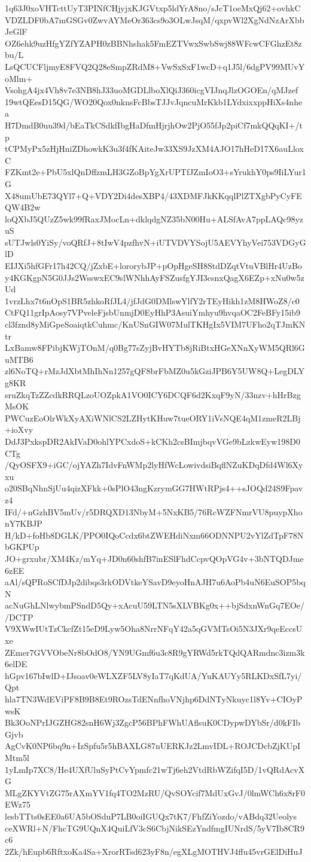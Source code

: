 1q63J0xoVHTcttUyT3PINfCHjyjxKJGVtxp5ldYrA8no/sJcT1oeMxQj62+ovhkC
VDZLDF0bA7mGSGv0ZwvAYMeOr363cs9o3OLwJsqM/qxpvWl2XgNdNzArXbbJeGlF
OZ6ehk9uzHfgYZfYZAPH0zBBNhshak5FmEZTVwxSwbSwj88WFcwCFGhzEt8zbu/L
LsQCUCFljmyE8FVQ2Q28eSmpZRdM8+VwSxSxF1wcD+q1J5l/6dgPV99MUvYoMlm+
VsohgA4jx4Vh8v7e3NB8hJ33uoMGDLlboXlQiJ360icgVIJnqJlzOGOEn/qMJzef
19wtQEesD15QG/WO20Qox0nknsFcBbsTJJvJqncuMrKkb1LYdxixxppHiXs4nhea
H7DmdB0uu39d/bEaTkCSdkfIbgHaDfmHjrjhOw2PjO55fJp2piCf7mkQQqKI+/tp
tCPMyPx5zHjHniZDhowkK3u3f4fKAiteJw33XS9JzXM4AJO17hHeD17X6auLloxC
FZKmt2e+PbU5xlQnDffzmLH3GZoBpYgXrUPTfJZmIoO3+sYrukhY0ps9IiLYur1G
X48umUbE73QYl7+Q+VDY2Di4desXBP4/43XDMFJkKKqqlPlZTXgbPyCyFEQW4B2w
loQXbJ5QUzZ5wk99fRaxJMocLn+dklqdgNZ35bN00Hu+ALSfAvA7ppLAQc98yzuS
sUTJwls0YiSy/voQRfJ+8tIwV4pzfhvN+iUTVDVYSojU5AEVYhyVei753VDGyGlD
EIJXi5hfGFr17h42CQ/jZxbE+lororybJP+pOpHgeSH8StdDZqtVtuVBlHr4UzBo
y4KGKgpN5G0JJs2WsswxEC9slWNhhAyFSZusfgYJI3csnxQagX6EZp+xNu0w5zUd
1vrzLhx7t6nOpS1BR5zhkoRfJL4/jfJdG0DMlswYlfY2rTEyHikh1zM8HWoZ8/c0
CtFQ11grIpAosy7VPveleFjsbUnmjD0EyHhP3AsuiYmhyu9hvqaOC2FeBFy15ib9
cl3fznd8yMiGpeSoaiqtkCuhmc/KnUSnGIW07MulTKHgIx5VIM7UFho2qTJmKNtr
LxBamw8FPibjKWjTOnM/q0Bg77sZyjBvHYTb8jRiBtxHGeXNnXyWM5QRl6GuMTB6
zl6NoTQ+rMzJdXbtMhIhNn1257gQF8brFbMZ0u5kGziJPB6Y5UW8Q+LegDLYg8KR
sruZkqTzZZcdkRRQLzoUOZpkA1VO0ICY6DCQF6d2KxqF9yN/33nzv+hHrBzgMsOK
PWCuzEoOlrWkXyAXiWNlCS2LZHytKHuw7tueORY1iVsNQE4qM1zmeR2LBj+ioXvy
DdJ3PxkspDR2AkIVaD0ohlYPCxdoS+kCKh2csBImjbqvVGe9bLzkwEyw198D0CTg
/QyOSFX9+iGC/ojYAZh7IdvFnWMp2lyHfWcLowivdsiBqflNZuKDqDfd4Wl6Xyxu
o20SBqNhnSjUu4qizXFkk+0sPlO43ngKzrymGG7HWtRPjs4++sJOQd24S9Fpavz4
IFd/+nGzhBV5mUv/r5DRQXD13NbyM+5NxKB5/76RcWZFNmrVU8puypXhonY7KBJP
H/kD+foHb8DGLK/PPO0IQoCcdx6btZWEHdiNxm66ODNNPU2vYlZdTpF78NbGKPUp
JO+grxubr/XM4Kz/mYq+JD0n60shfB7inESlFhdCcpvQOpVG4v+3bNTQDJme6zEE
aAl/sQPRoSCfDJp2dibqs3rkODVtkeYSavD9eyoHnAJH7u6AoPb4uN6EuSOP5bqN
acNuGhLNlwybmPSndD5Qy+xAcuU59LTN5sXLVBKg0x++bjSdxnWnGq7EOe//DCTP
V9XWwIUtTzCkcfZt15eD9Lyw5Oha8NrrNFqY42a5qGVMTsOi5N3JXr9qeEccsUxe
ZEmer7GVVObeNr8bOdO8/YN9UGmf6u3c8R9gYRWd5rkTQdQARmdnc3izm3k6elDE
hGpv167bIwlD+IJsoav0eWLXZF5LV8yIaT7qKdUA/YuKAUYy5RLKDxSfL7yi/Qpt
hla7TN3WdEViPF8B9B8Et9ROzsTdENnfhoVNjhp6DdNTyNkuyc1l8Yv+CIOyPwsK
Bk3OoNPrIJGZHG82snH6Wj3ZgcP56BPhFWhUAflsuK0CDypwDYbSr/d0kFIbGjvb
AgCvK0NP6bq9n+IzSpfu5r5hBAXLG87nUERKJz2LmvIDL+ROJCDcbZjKUpIMtm5l
1yLmIp7XC8/He4UXfUluSyPtCvYpmfc21wTj6eh2VtdRbWZifqI5D/1vQRdAcvXG
MLgZKYVtZG75rAXmYV1fq4TO2MzRU/QvSOYcif7MdUxGvJ/0lmWCh6x8rF0EWz75
lesbTTts0sEE0a6UA5bOSduP7LB0oiIGUQx7tK7/FhfZiYozdo/vABdq32Ueolys
ceXWRl+N/FhcTG9UQnX4QuiLfV3cS6CbjNikSEzYndfmgIUNrdS/5yV7Ib8CR9c6
2Zk/hEupb6RftxoKa4Sa+XrorRTsd623yF8n/egXLgMOTHVJ4ffu45vrGElDiHuJ
